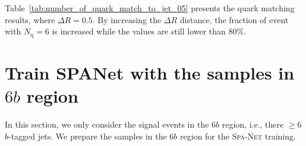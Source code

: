 \documentclass[12pt]{article}
\begin{document}
        Table~\ref{tab:number_of_quark_match_to_jet_05} presents the quark matching results, where $\Delta R = 0.5$. By increasing the $\Delta R$ distance, the fraction of event with $N_{\text{q}} = 6$ is increased while the values are still lower than 80\%.
        \begin{table}[htpb]
            \centering
            \caption{The quark matching table. $N_{\text{q}}$ is the number of quarks that can be matched to jets in an event.}
            \label{tab:number_of_quark_match_to_jet_05}
        \end{table}
\section{Train SPANet with the samples in \texorpdfstring{$6b$}{6b} region}%
\label{sec:train_spanet_with_the_samples_in_6b_region}
    In this section, we only consider the signal events in the $6b$ region, i.e., there $\ge 6$ $b$-tagged jets. We prepare the samples in the $6b$ region for the \textsc{Spa-Net} training. 
\end{document}
